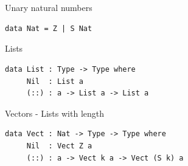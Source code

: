 \documentclass{beamer}
\begin{document}
\section{\dependentTypes}
\label{sec:dependentTypes}
\begin{frame}[fragile]{\dependentTypes}
	\begin{block}{Unary natural numbers}
		 \begin{lstlisting}[basicstyle=\ttfamily\scriptsize]
data Nat = Z | S Nat
		\end{lstlisting}
	\end{block}
	
	\begin{block}{Lists}
		 \begin{lstlisting}[basicstyle=\ttfamily\scriptsize]
data List : Type -> Type where
     Nil  : List a
	 (::) : a -> List a -> List a		
		\end{lstlisting}
	\end{block}
	
	\begin{block}{Vectors - Lists with length}
		 \begin{lstlisting}[basicstyle=\ttfamily\scriptsize]
data Vect : Nat -> Type -> Type where
	 Nil  : Vect Z a
	 (::) : a -> Vect k a -> Vect (S k) a	
		\end{lstlisting}
	\end{block}
\end{frame}
\end{document}
